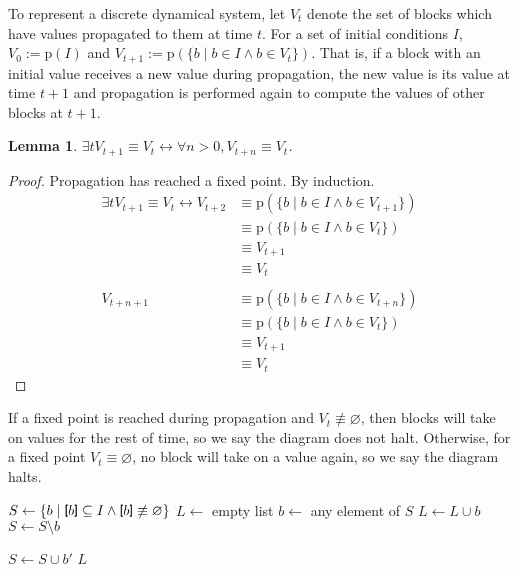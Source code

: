 \documentclass[twocolumn]{article}
\newtheorem{lemma}{Lemma}
\newcommand{\TightBracketB}[1]{\raisebox{0.25ex}{\scalebox{0.8}{\boldmath${#1\kern-0.65ex#1}$}}}%
\newcommand*{\Inputs}[1]{\TightBracketB[#1\TightBracketB]}
\begin{document}
To represent a discrete dynamical system, let $V_t$ denote the set of blocks which have values propagated to them at time $t$. For a set of initial conditions $I$, $V_0 := \text{p}(I)$ and $V_{t+1} := \text{p}(\{b\mid b\in I \land b\in V_t\})$. That is, if a block with an initial value receives a new value during propagation, the new value is its value at time $t+1$ and propagation is performed again to compute the values of other blocks at $t+1$.

\begin{lemma}\label{lem:fixedpoint}
    $\exists t V_{t+1}\equiv V_t \leftrightarrow \forall n>0, V_{t+n}\equiv V_t$.
\end{lemma}
\begin{proof} Propagation has reached a fixed point. By induction.
    \[
       \begin{aligned}
           \exists t V_{t+1}\equiv V_t \leftrightarrow V_{t+2} &\equiv \text{p}(\{b\mid b\in I \land b\in V_{t+1}\}) \\
           &\equiv \text{p}(\{b\mid b\in I \land b\in V_{t}\}) \\
           &\equiv V_{t+1} \\
           &\equiv V_{t} \\ \\
           V_{t+n+1} &\equiv \text{p}(\{b\mid b\in I \land b\in V_{t+n}\}) \\
           &\equiv \text{p}(\{b\mid b\in I \land b\in V_{t}\}) \\
           &\equiv V_{t+1} \\
           &\equiv V_{t}
           \end{aligned}
    \]
\end{proof}

If a fixed point is reached during propagation and $V_t\not\equiv\varnothing$, then blocks will take on values for the rest of time, so we say the diagram does not halt. Otherwise, for a fixed point $V_t\equiv\varnothing$, no block will take on a value again, so we say the diagram halts.

\begin{algorithm}[h]
\caption{$\text{p}(I)$}
\label{alg:propogation}
\begin{algorithmic}[1]
\State $S \gets \{b \mid \Inputs{b}\subseteq I \land \Inputs{b}\not\equiv\varnothing\}$
\State $L \gets$ empty list
    \State $b \gets$ any element of $S$
    \State $L \gets L\cup b$
    \State $S \gets S\setminus b$
    
    \For{each $b'$ where $b\in\Inputs{b'}$}
        \If{$b'\not\in L\land\Inputs{b'}\subseteq L$}
            \State $S \gets S\cup b'$
        \EndIf
    \EndFor
\EndWhile
\State \Return $L$
\end{algorithmic}
\end{algorithm}
\end{document}
